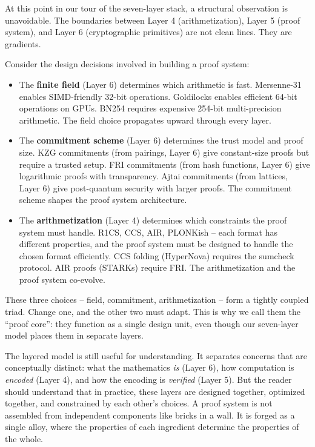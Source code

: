 \documentclass[
  11pt,
  openany]{report}
\renewcommand{\textbf}[1]{{\bfseries\color{MidnightBold}#1}}
\begin{document}
At this point in our tour of the seven-layer stack, a structural observation is
unavoidable. The boundaries between Layer 4 (arithmetization), Layer 5 (proof
system), and Layer 6 (cryptographic primitives) are not clean lines. They are
gradients.

Consider the design decisions involved in building a proof system:

\begin{itemize}
\item
  The \textbf{finite field} (Layer 6) determines which arithmetic is fast.
  Mersenne-31 enables SIMD-friendly 32-bit operations. Goldilocks enables
  efficient 64-bit operations on GPUs. BN254 requires expensive 254-bit
  multi-precision arithmetic. The field choice propagates upward through every
  layer.
\item
  The \textbf{commitment scheme} (Layer 6) determines the trust model and proof
  size. KZG commitments (from pairings, Layer 6) give constant-size proofs but
  require a trusted setup. FRI commitments (from hash functions, Layer 6) give
  logarithmic proofs with transparency. Ajtai commitments (from lattices, Layer
  6) give post-quantum security with larger proofs. The commitment scheme shapes
  the proof system architecture.
\item
  The \textbf{arithmetization} (Layer 4) determines which constraints the proof
  system must handle. R1CS, CCS, AIR, PLONKish -- each format has different
  properties, and the proof system must be designed to handle the chosen format
  efficiently. CCS folding (HyperNova) requires the sumcheck protocol. AIR
  proofs (STARKs) require FRI. The arithmetization and the proof system
  co-evolve.
\end{itemize}

These three choices -- field, commitment, arithmetization -- form a tightly
coupled triad. Change one, and the other two must adapt. This is why we call
them the ``proof core'': they function as a single design unit, even though our
seven-layer model places them in separate layers.

The layered model is still useful for understanding. It separates concerns that
are conceptually distinct: what the mathematics \emph{is} (Layer 6), how
computation is \emph{encoded} (Layer 4), and how the encoding is \emph{verified}
(Layer 5). But the reader should understand that in practice, these layers are
designed together, optimized together, and constrained by each other's choices.
A proof system is not assembled from independent components like bricks in a
wall. It is forged as a single alloy, where the properties of each ingredient
determine the properties of the whole.
\end{document}
